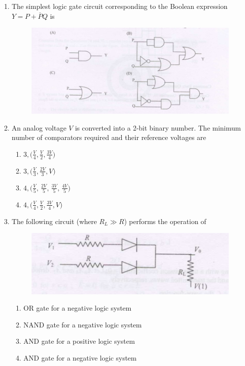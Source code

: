 \documentclass[journal,12pt,onecolumn]{IEEEtran}
\theoremstyle{remark}
\begin{document}
\begin{enumerate}
\item The simplest logic gate circuit corresponding to the Boolean expression $Y = P + \overline{P}Q$ is
\hfill{}
\begin{figure}[H]
    \centering
    \includegraphics[width = 0.6\columnwidth]{fig/Q.67.png}
    \caption*{}
    \label{fig:Q67}
\end{figure}
\item An analog voltage $V$ is converted into a 2-bit binary number. The minimum number of comparators required and their reference voltages are
\hfill{}
\begin{multicols}{2}
\begin{enumerate}
    \item $3, \bigl(\tfrac{V}{4},\tfrac{V}{2},\tfrac{3V}{4}\bigr)$
    \item $3, \bigl(\tfrac{V}{3},\tfrac{2V}{3},V\bigr)$
    \item $4, \bigl(\tfrac{V}{5},\,\tfrac{2V}{5},\,\tfrac{3V}{5},\,\tfrac{4V}{5}\bigr)$
    \item $4,\bigl(\tfrac{V}{4},\tfrac{V}{2},\tfrac{3V}{4},V\bigr)$
\end{enumerate}
\end{multicols}

\item The following circuit (where $R_L \gg R$) performs the operation of
\begin{figure}[H]
    \centering
    \includegraphics[width = 0.6\columnwidth]{fig/Q.69.png}
    \caption*{}
    \label{fig:Q69}
\end{figure}
\hfill{}
\begin{multicols}{2}
\begin{enumerate}
    \item OR gate for a negative logic system
    \item NAND gate for a negative logic system
    \item AND gate for a positive logic system
    \item AND gate for a negative logic system
\end{enumerate}
\end{multicols}
 

\end{enumerate}
\end{document}

